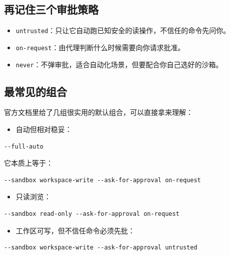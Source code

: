 \documentclass[UTF8,a4paper,12pt]{ctexart}
\begin{document}
\subsection{再记住三个审批策略}

\begin{itemize}
  \item \texttt{untrusted}：只让它自动跑已知安全的读操作，不信任的命令先问你。
  \item \texttt{on-request}：由代理判断什么时候需要向你请求批准。
  \item \texttt{never}：不弹审批，适合自动化场景，但要配合你自己选好的沙箱。
\end{itemize}

\subsection{最常见的组合}

官方文档里给了几组很实用的默认组合，可以直接拿来理解：

\begin{itemize}
  \item 自动但相对稳妥：
\end{itemize}

\begin{lstlisting}[style=cli]
--full-auto
\end{lstlisting}

它本质上等于：

\begin{lstlisting}[style=cli]
--sandbox workspace-write --ask-for-approval on-request
\end{lstlisting}

\begin{itemize}
  \item 只读浏览：
\end{itemize}

\begin{lstlisting}[style=cli]
--sandbox read-only --ask-for-approval on-request
\end{lstlisting}

\begin{itemize}
  \item 工作区可写，但不信任命令必须先批：
\end{itemize}

\begin{lstlisting}[style=cli]
--sandbox workspace-write --ask-for-approval untrusted
\end{lstlisting}
\end{document}
